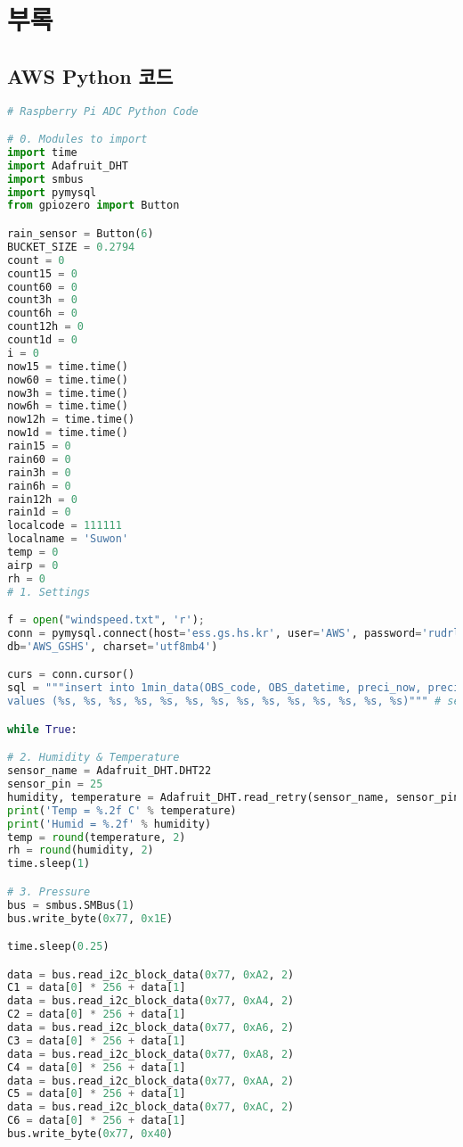 \section{부록}

\subsection{AWS Python 코드}


\begin{lstlisting}[language=python]
# Raspberry Pi ADC Python Code

# 0. Modules to import
import time
import Adafruit_DHT
import smbus
import pymysql
from gpiozero import Button

rain_sensor = Button(6)
BUCKET_SIZE = 0.2794
count = 0
count15 = 0
count60 = 0
count3h = 0
count6h = 0
count12h = 0
count1d = 0
i = 0
now15 = time.time()
now60 = time.time()
now3h = time.time()
now6h = time.time()
now12h = time.time()
now1d = time.time()
rain15 = 0
rain60 = 0
rain3h = 0
rain6h = 0
rain12h = 0
rain1d = 0
localcode = 111111
localname = 'Suwon'
temp = 0
airp = 0
rh = 0
# 1. Settings

f = open("windspeed.txt", 'r');
conn = pymysql.connect(host='ess.gs.hs.kr', user='AWS', password='rudrlrhkgkrrh',
db='AWS_GSHS', charset='utf8mb4')

curs = conn.cursor()
sql = """insert into 1min_data(OBS_code, OBS_datetime, preci_now, preci_15, preci_60, preci_3H, preci_6H, preci_12H, preci_1day, temperature, wind_spd01, RH, Air_P, REMARK)
values (%s, %s, %s, %s, %s, %s, %s, %s, %s, %s, %s, %s, %s, %s)""" # server database information

while True:

# 2. Humidity & Temperature
sensor_name = Adafruit_DHT.DHT22
sensor_pin = 25
humidity, temperature = Adafruit_DHT.read_retry(sensor_name, sensor_pin)
print('Temp = %.2f C' % temperature)
print('Humid = %.2f' % humidity)
temp = round(temperature, 2)
rh = round(humidity, 2)
time.sleep(1)

# 3. Pressure
bus = smbus.SMBus(1)
bus.write_byte(0x77, 0x1E)

time.sleep(0.25)

data = bus.read_i2c_block_data(0x77, 0xA2, 2)
C1 = data[0] * 256 + data[1]
data = bus.read_i2c_block_data(0x77, 0xA4, 2)
C2 = data[0] * 256 + data[1]
data = bus.read_i2c_block_data(0x77, 0xA6, 2)
C3 = data[0] * 256 + data[1]
data = bus.read_i2c_block_data(0x77, 0xA8, 2)
C4 = data[0] * 256 + data[1]
data = bus.read_i2c_block_data(0x77, 0xAA, 2)
C5 = data[0] * 256 + data[1]
data = bus.read_i2c_block_data(0x77, 0xAC, 2)
C6 = data[0] * 256 + data[1]
bus.write_byte(0x77, 0x40)


\end{lstlisting}
